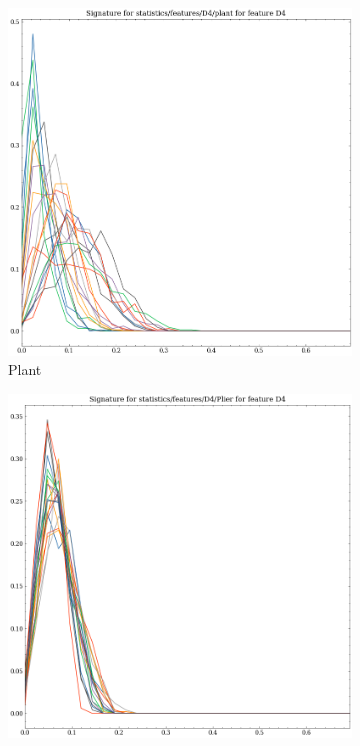 \begin{figure}
    \centering
      \begin{subfigure}[b]{0.23\textwidth}
        \includegraphics[width=\textwidth]{assets/feature_extraction/D4/plant.png}
        \caption{Plant}
    \end{subfigure}
    \hfill
    \begin{subfigure}[b]{0.23\textwidth}
        \includegraphics[width=\textwidth]{assets/feature_extraction/D4/Plier.png}

\end{subfigure}
\end{figure}
